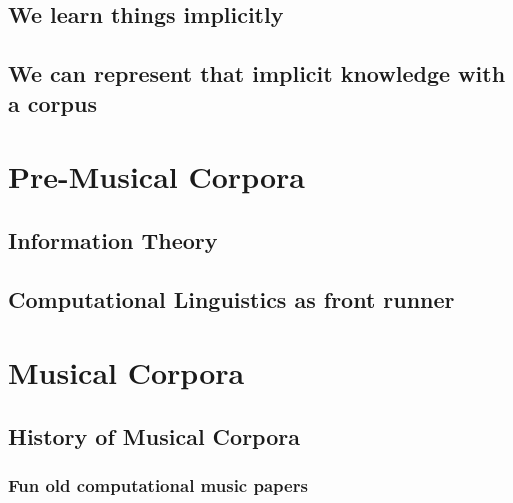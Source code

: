 \documentclass[]{book}
\theoremstyle{definition}
\theoremstyle{definition}
\theoremstyle{definition}
\theoremstyle{remark}
\begin{document}
\hypertarget{we-learn-things-implicitly}{%
\subsection{We learn things
implicitly}\label{we-learn-things-implicitly}}

\hypertarget{we-can-represent-that-implicit-knowledge-with-a-corpus}{%
\subsection{We can represent that implicit knowledge with a
corpus}\label{we-can-represent-that-implicit-knowledge-with-a-corpus}}

\hypertarget{pre-musical-corpora}{%
\section{Pre-Musical Corpora}\label{pre-musical-corpora}}

\hypertarget{information-theory}{%
\subsection{Information Theory}\label{information-theory}}

\hypertarget{computational-linguistics-as-front-runner}{%
\subsection{Computational Linguistics as front
runner}\label{computational-linguistics-as-front-runner}}

\hypertarget{musical-corpora}{%
\section{Musical Corpora}\label{musical-corpora}}

\hypertarget{history-of-musical-corpora}{%
\subsection{History of Musical
Corpora}\label{history-of-musical-corpora}}

\hypertarget{fun-old-computational-music-papers}{%
\subsubsection{Fun old computational music
papers}\label{fun-old-computational-music-papers}}
\end{document}
